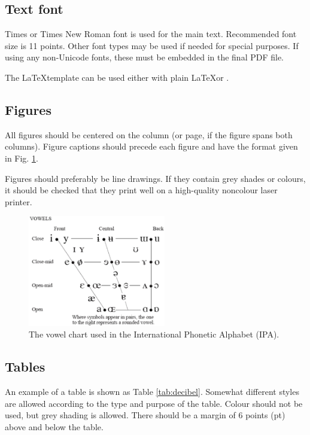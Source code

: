 \documentclass[a4paper,11pt,twocolumn]{article}
\begin{document}
\subsection{Text font}

Times or Times New Roman font is used for the main text. Recommended
font size is 11 points. Other font types may be used if needed for
special purposes. If using any non-Unicode fonts, these must be embedded
in the final PDF file.

The \LaTeX template can be used either with plain \LaTeX or \XeLaTeX.

\subsection{Figures}

All figures should be centered on the column (or page, if the figure
spans both columns). Figure captions should precede each figure and have
the format given in Fig. \ref{fig:vowels}.

Figures should preferably be line drawings. If they contain grey shades
or colours, it should be checked that they print well on a high-quality
noncolour laser printer.

\begin{figure}[!ht]
  \caption{The vowel chart used in the International Phonetic Alphabet (IPA).}
  \label{fig:vowels}
  \begin{center}
  \includegraphics[width=6cm]{./includes/figures/ipa.eps}
  \end{center}
\end{figure}

\subsection{Tables}

An example of a table is shown as Table \ref{tab:decibel}. Somewhat
different styles are allowed according to the type and purpose of the
table. Colour should not be used, but grey shading is allowed. There
should be a margin of 6 points (pt) above and below the table.
\end{document}
